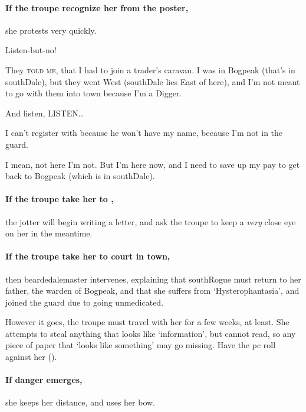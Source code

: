 \paragraph{If the troupe recognize her from the poster,}
she protests very quickly.

\begin{speechtext}
  Listen-but-no!
  
  They {\scshape told me}, that I had to join a trader's caravan.
  I was in Bogpeak (that's in \gls{southDale}), but they went West (\gls{southDale} lies East of here), and I'm not meant to go with them into \gls{town} because I'm a Digger.
  
  And listen, LISTEN\ldots

  I can't register with  because he won't have my name, because I'm not in the \gls{guard}.

  I mean, not here I'm not.
  But I'm here now, and I need to save up my pay to get back to Bogpeak (which is in \gls{southDale}).
\end{speechtext}

\paragraph{If the troupe take her to ,}
the \gls{jotter} will begin writing a letter, and ask the troupe to keep a \textit{very} close eye on her in the meantime.

\paragraph{If the troupe take her to \gls{court} in \gls{town},}
then \gls{beardedalemaster} intervenes, explaining that \gls{southRogue} must return to her father, the \gls{warden} of Bogpeak, and that she suffers from `Hysterophantasia', and joined the \gls{guard} due to going unmedicated.

\southRogue

However it goes, the troupe must travel with her for a few weeks, at least.
She attempts to steal anything that looks like `information', but cannot read, so any piece of paper that `looks like something' may go missing.
Have the \gls{pc} roll  against her  (\tn).

\paragraph{If danger emerges,}
she keeps her distance, and uses her bow.

